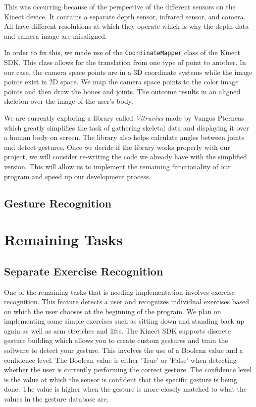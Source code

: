 \documentclass[onecolumn, draftclsnofoot,10pt, compsoc]{IEEEtran}
\begin{document}
This was occurring because of the perspective of the different sensors on the Kinect device. It contains a separate depth sensor, infrared sensor, and camera. All have different resolutions at which they operate which is why the depth data and camera image are misaligned. 

In order to fix this, we made use of the \texttt{CoordinateMapper} class of the Kinect SDK. This class allows for the translation from one type of point to another. In our case, the camera space points are in a 3D coordinate systems while the image points exist in 2D space. We map the camera space points to the color image points and then draw the bones and joints. The outcome results in an aligned skeleton over the image of the user's body. 

We are currently exploring a library called \textit{Vitruvius} made by Vangos Pterneas which greatly simplifies the task of gathering skeletal data and displaying it over a human body on screen. The library also helps calculate angles between joints and detect gestures. Once we decide if the library works properly with our project, we will consider re-writing the code we already have with the simplified version. This will allow us to implement the remaining functionality of our program and speed up our development process.

\subsection{Gesture Recognition}

\section{Remaining Tasks}
\subsection{Separate Exercise Recognition}
One of the remaining tasks that is needing implementation involves exercise recognition. This feature detects a user and recognizes individual exercises based on which the user chooses at the beginning of the program. We plan on implementing some simple exercises such as sitting down and standing back up again as well as arm stretches and lifts. The Kinect SDK supports discrete gesture building which allows you to create custom gestures and train the software to detect your gesture. This involves the use of a Boolean value and a confidence level. The Boolean value is either 'True' or 'False' when detecting whether the user is currently performing the correct gesture. The confidence level is the value at which the sensor is confident that the specific gesture is being done. The value is higher when the gesture is more closely matched to what the values in the gesture database are.
\end{document}
